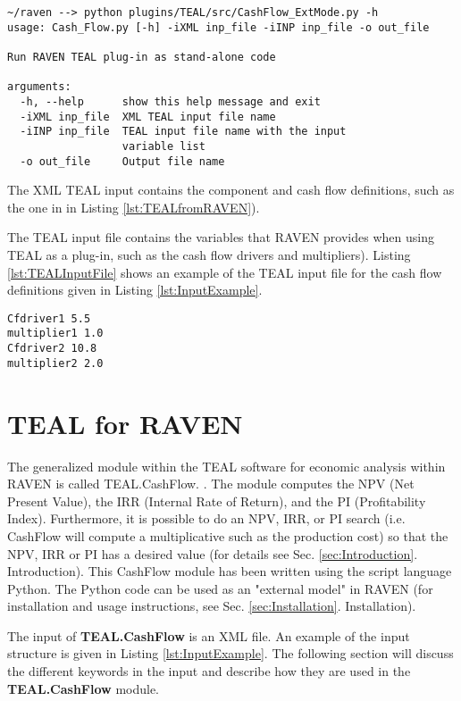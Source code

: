 \small
\begin{lstlisting}[style=XML,caption=TEAL run as stand-alone Python code, label=lst:TEALAsCode]
~/raven --> python plugins/TEAL/src/CashFlow_ExtMode.py -h
usage: Cash_Flow.py [-h] -iXML inp_file -iINP inp_file -o out_file

Run RAVEN TEAL plug-in as stand-alone code

arguments:
  -h, --help      show this help message and exit
  -iXML inp_file  XML TEAL input file name
  -iINP inp_file  TEAL input file name with the input
                  variable list
  -o out_file     Output file name
\end{lstlisting}
\normalsize

The XML TEAL input contains the component and cash flow definitions, such as the one in  in Listing \ref{lst:TEALfromRAVEN}).

The TEAL input file contains the variables that RAVEN provides when using TEAL as a plug-in, such as the cash flow drivers and multipliers).
Listing \ref{lst:TEALInputFile} shows an example of the TEAL input file for the cash flow definitions given in Listing \ref{lst:InputExample}.

\begin{lstlisting}[caption=TEAL run as stand-alone Python code, label=lst:TEALInputFile]
Cfdriver1 5.5
multiplier1 1.0
Cfdriver2 10.8
multiplier2 2.0
\end{lstlisting}

\section{TEAL for RAVEN}
The generalized module within the TEAL software for economic analysis within RAVEN is called TEAL.CashFlow. \cite{MSApril2017}. The module computes
the NPV (Net Present Value), the IRR (Internal Rate of Return), and the PI (Profitability Index). Furthermore, it is possible to
do an NPV, IRR, or PI search (i.e. CashFlow will compute a multiplicative such as the production cost) so that the
NPV, IRR or PI has a desired value (for details see Sec. \ref{sec:Introduction}. Introduction). This CashFlow module has been written using the script language Python.
The Python code can be used as an "external model" in RAVEN (for installation and usage instructions, see Sec. \ref{sec:Installation}. Installation).

The input of \textbf{TEAL.CashFlow} is an XML file. An example of the input structure is given in Listing \ref{lst:InputExample}. The following section will discuss the
 different keywords in the input and describe how they are used in the \textbf{TEAL.CashFlow} module.

